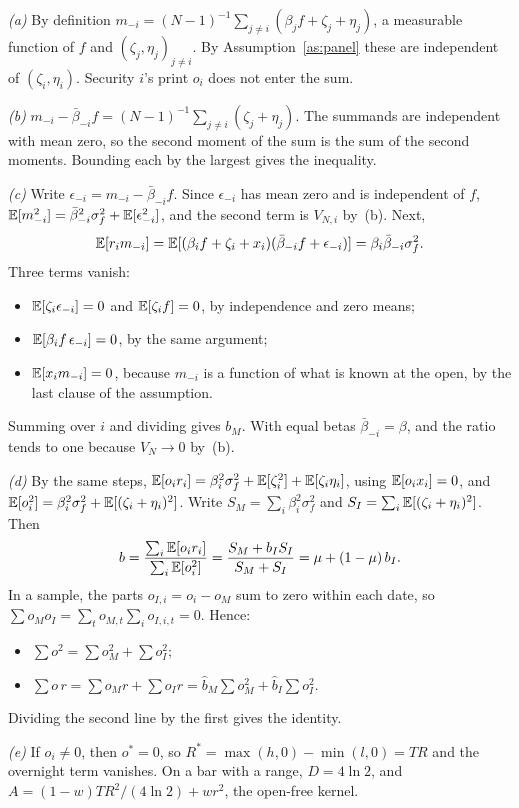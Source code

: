 \emph{(a)} By definition $m_{-i}=(N-1)^{-1}\sum_{j\ne i}(\beta_jf+\zeta_j+\eta_j)$, a measurable
function of $f$ and $(\zeta_j,\eta_j)_{j\ne i}$. By Assumption~\ref{as:panel} these are independent of
$(\zeta_i,\eta_i)$. Security $i$'s print $o_i$ does not enter the sum.

\emph{(b)} $m_{-i}-\bar\beta_{-i}f=(N-1)^{-1}\sum_{j\ne i}(\zeta_j+\eta_j)$. The summands are independent
with mean zero, so the second moment of the sum is the sum of the second moments. Bounding each by the
largest gives the inequality.

\emph{(c)} Write $\epsilon_{-i}=m_{-i}-\bar\beta_{-i}f$. Since $\epsilon_{-i}$ has mean zero and is
independent of $f$, $\mathbb{E}[m_{-i}^2]=\bar\beta_{-i}^2\sigma_f^2+\mathbb{E}[\epsilon_{-i}^2]$, and the second term
is $V_{N,i}$ by~(b). Next,
\[
  \mathbb{E}[r_im_{-i}]=\mathbb{E}[(\beta_if+\zeta_i+x_i)(\bar\beta_{-i}f+\epsilon_{-i})]=\beta_i\bar\beta_{-i}\sigma_f^2.
\]
Three terms vanish:
\begin{itemize}
  \item $\mathbb{E}[\zeta_i\epsilon_{-i}]=0$ and $\mathbb{E}[\zeta_if]=0$, by independence and zero means;
  \item $\mathbb{E}[\beta_if\,\epsilon_{-i}]=0$, by the same argument;
  \item $\mathbb{E}[x_im_{-i}]=0$, because $m_{-i}$ is a function of what is known at the open, by the last
        clause of the assumption.
\end{itemize}
Summing over $i$ and dividing gives $b_M$. With equal betas $\bar\beta_{-i}=\beta$, and the ratio tends
to one because $V_N\to0$ by~(b).

\emph{(d)} By the same steps,
$\mathbb{E}[o_ir_i]=\beta_i^2\sigma_f^2+\mathbb{E}[\zeta_i^2]+\mathbb{E}[\zeta_i\eta_i]$, using $\mathbb{E}[o_ix_i]=0$, and
$\mathbb{E}[o_i^2]=\beta_i^2\sigma_f^2+\mathbb{E}[(\zeta_i+\eta_i)^2]$. Write $S_M=\sum_i\beta_i^2\sigma_f^2$ and
$S_I=\sum_i\mathbb{E}[(\zeta_i+\eta_i)^2]$. Then
\[
  b=\frac{\sum_i\mathbb{E}[o_ir_i]}{\sum_i\mathbb{E}[o_i^2]}=\frac{S_M+b_IS_I}{S_M+S_I}=\mu+(1-\mu)\,b_I.
\]
In a sample, the parts $o_{I,i}=o_i-o_M$ sum to zero within each date, so
$\sum o_Mo_I=\sum_to_{M,t}\sum_io_{I,i,t}=0$. Hence:
\begin{itemize}
  \item $\sum o^2=\sum o_M^2+\sum o_I^2$;
  \item $\sum o\,r=\sum o_Mr+\sum o_Ir=\hat b_M\sum o_M^2+\hat b_I\sum o_I^2$.
\end{itemize}
Dividing the second line by the first gives the identity.

\emph{(e)} If $o_i\ne0$, then $o^*=0$, so $R^*=\max(h,0)-\min(l,0)=TR$ and the overnight term vanishes.
On a bar with a range, $D=4\ln2$, and $A=(1-w)TR^2/(4\ln2)+wr^2$, the open-free kernel.

